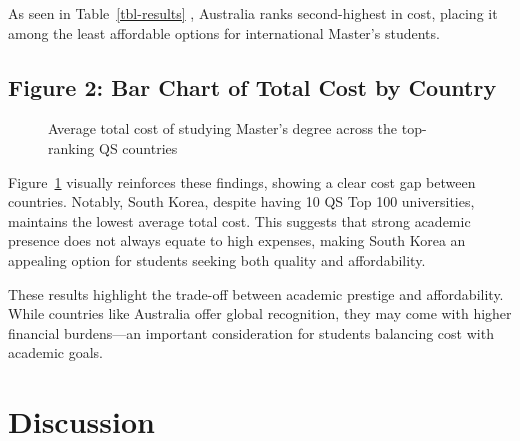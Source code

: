 \documentclass[
  letterpaper,
  DIV=11,
  numbers=noendperiod]{scrartcl}
\begin{document}
As seen in Table~\ref{tbl-results} , Australia ranks second-highest in
cost, placing it among the least affordable options for international
Master's students.

\subsection{Figure 2: Bar Chart of Total Cost by
Country}\label{figure-2-bar-chart-of-total-cost-by-country}

\begin{figure}


\caption{\label{fig-costs}Average total cost of studying Master's degree
across the top-ranking QS countries}

\end{figure}%

Figure~\ref{fig-costs} visually reinforces these findings, showing a
clear cost gap between countries. Notably, South Korea, despite having
10 QS Top 100 universities, maintains the lowest average total cost.
This suggests that strong academic presence does not always equate to
high expenses, making South Korea an appealing option for students
seeking both quality and affordability.

These results highlight the trade-off between academic prestige and
affordability. While countries like Australia offer global recognition,
they may come with higher financial burdens---an important consideration
for students balancing cost with academic goals.

\section{Discussion}\label{discussion}
\end{document}
